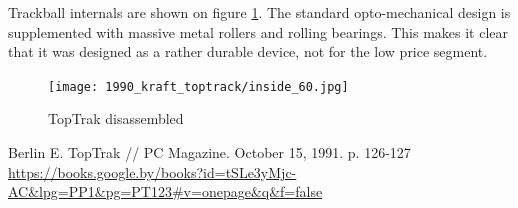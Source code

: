 \documentclass[11pt, a4paper]{article}
\begin{document}
Trackball internals are shown on figure \ref{fig:TopTrakInside}. The standard opto-mechanical design is supplemented with massive metal rollers and rolling bearings. This makes it clear that it was designed as a rather durable device, not for the low price segment.

\begin{figure}[h]
    \centering
    \texttt{[image: 1990\_kraft\_toptrack/inside\_60.jpg]}
    \caption{TopTrak disassembled}
    \label{fig:TopTrakInside}
\end{figure}

\begin{thebibliography}{9}
 Berlin E. TopTrak // PC Magazine. October 15, 1991. p. 126-127 \url{https://books.google.by/books?id=tSLe3yMjc-AC&lpg=PP1&pg=PT123#v=onepage&q&f=false}
\end{thebibliography}
\end{document}
